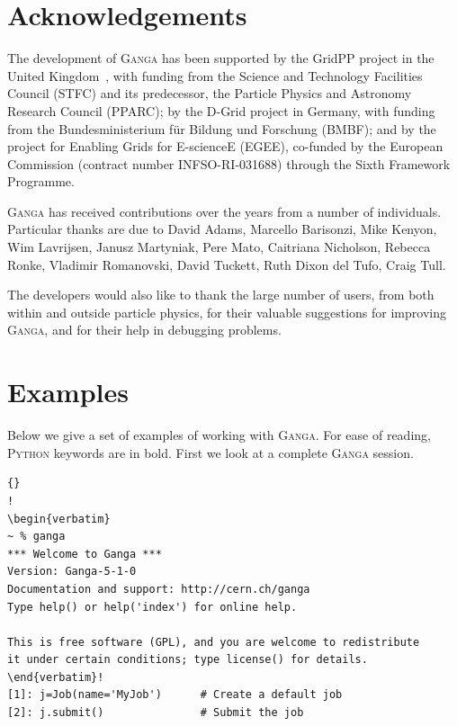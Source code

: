 \documentclass{elsart}
\def\ganga {\textsc{Ganga}\xspace}
\def\python {\textsc{Python}\xspace}
\begin{document}
\begin{linenumbers}
\section{Acknowledgements}
\label{sec:acknowledgements}
The development of \ganga has been supported by the GridPP project in the
United Kingdom~\cite{Faulkner:2006px}, with funding from the Science and Technology
Facilities Council (STFC) and its predecessor, the Particle Physics and
Astronomy Research Council (PPARC); by the D-Grid project in Germany,
with funding from the Bundesministerium f\"ur Bildung und Forschung
(BMBF); and by the project for Enabling Grids for E-scienceE (EGEE),   
co-funded by the European Commission (contract number INFSO-RI-031688) through the Sixth
Framework Programme.

\ganga has received contributions over the years from a number of
individuals.  Particular thanks are due to David Adams, Marcello
Barisonzi, Mike Kenyon, Wim Lavrijsen, Janusz Martyniak, Pere Mato,
Caitriana Nicholson, Rebecca Ronke, Vladimir Romanovski, David
Tuckett, Ruth Dixon del Tufo, Craig Tull.

The developers would also like to thank the large number of users, from both
within and outside particle physics, for their valuable suggestions for
improving \ganga, and for their help in debugging problems.


\appendix

\section{Examples}
\label{sec:examples}
Below we give a set of examples of working with \ganga. For ease of reading,
\python keywords are in bold. First we look at a complete \ganga session.
\vspace{-2ex}

\tiny
\lstset{language=Python} \lstset{commentstyle=\textit}
\lstset{backgroundcolor=,rulecolor=}
\begin{lstlisting}[escapechar=!]{}
!
\begin{verbatim}
~ % ganga
*** Welcome to Ganga ***
Version: Ganga-5-1-0
Documentation and support: http://cern.ch/ganga
Type help() or help('index') for online help.

This is free software (GPL), and you are welcome to redistribute
it under certain conditions; type license() for details.
\end{verbatim}!
[1]: j=Job(name='MyJob')      # Create a default job
[2]: j.submit()               # Submit the job


\end{lstlisting}
\end{linenumbers}
\end{document}
